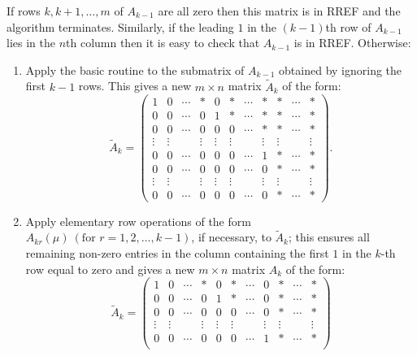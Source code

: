 \documentclass[10pt, a4paper]{article}
\begin{document}
If rows $k, k + 1, \dotsc, m$ of $A_{k - 1}$ are all zero then this matrix is in RREF and the algorithm terminates.
Similarly, if the leading $1$ in the $(k - 1)$th row of $A_{k - 1}$ lies in the $n$th column then it is easy to check that $A_{k - 1}$ is in RREF.
Otherwise:
\begin{enumerate}[label = (\roman*).]
    \item Apply the basic routine to the submatrix of $A_{k - 1}$ obtained by ignoring the first $k - 1$ rows.
    This gives a new $m \times n$ matrix $\tilde{A}_k$ of the form:
    \[
    \tilde{A}_k = \begin{pmatrix}
        1 & 0 & \dotsi & * & 0 & * & \dotsi & * & * & \dotsi & * \\
        0 & 0 & \dotsi & 0 & 1 & * & \dotsi & * & * & \dotsi & * \\
        0 & 0 & \dotsi & 0 & 0 & 0 & \dotsi & * & * & \dotsi & * \\
        \vdots & \vdots & \phantom{} & \vdots & \vdots & \vdots & \phantom{} & \vdots & \vdots & \phantom{} & \vdots \\
        0 & 0 & \dotsi & 0 & 0 & 0 & \dotsi & 1 & * & \dotsi & * \\
        0 & 0 & \dotsi & 0 & 0 & 0 & \dotsi & 0 & * & \dotsi & * \\
        \vdots & \vdots & \phantom{} & \vdots & \vdots & \vdots & \phantom{} & \vdots & \vdots & \phantom{} & \vdots \\
        0 & 0 & \dotsi & 0 & 0 & 0 & \dotsi & 0 & * & \dotsi & *
    \end{pmatrix}.
    \]
    \item Apply elementary row operations of the form $A_{k r}(\mu)\ (\text{for } r = 1, 2, \dotsc, k - 1)$,
    if necessary, to $\tilde{A}_k$; this ensures all remaining non-zero entries in the column containing the first $1$ in the $k$-th row equal to zero and gives a new $m \times n$ matrix $A_k$ of the form:
    \[
    \tilde{A}_k = \begin{pmatrix}
        1 & 0 & \dotsi & * & 0 & * & \dotsi & 0 & * & \dotsi & * \\
        0 & 0 & \dotsi & 0 & 1 & * & \dotsi & 0 & * & \dotsi & * \\
        0 & 0 & \dotsi & 0 & 0 & 0 & \dotsi & 0 & * & \dotsi & * \\
        \vdots & \vdots & \phantom{} & \vdots & \vdots & \vdots & \phantom{} & \vdots & \vdots & \phantom{} & \vdots \\
        0 & 0 & \dotsi & 0 & 0 & 0 & \dotsi & 1 & * & \dotsi & * \\

\end{pmatrix}\]
\end{enumerate}
\end{document}

